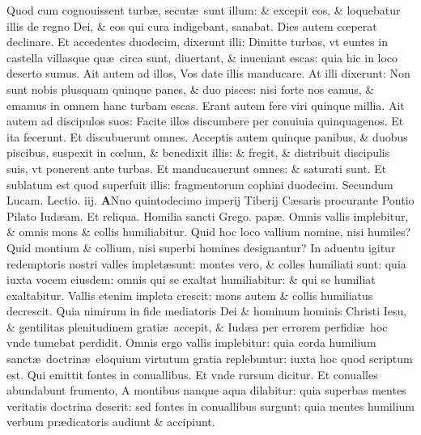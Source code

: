 \documentclass[a5paper,10pt]{book}
\def\rightmarginnote{%
	\lrmarginnote{\hskip\columnwidth \hskip -1em}}
\def\ae{æ}
\def\oe{œ}
\begin{document}
\begin{multicols*}{2}
Quod cum cognouissent turb\ae , secut\ae \ sunt illum: \& excepit eos, \& loquebatur illis de regno Dei, \& eos qui cura indigebant, sanabat.
Dies autem c\oe perat declinare. Et accedentes duodecim, dixerunt illi: Dimitte turbas, vt euntes in castella villasque qu\ae \ circa sunt, diuertant, \& inueniant escas: quia hic in loco deserto sumus.
Ait autem ad illos, Vos date illis manducare. At illi dixerunt: Non sunt nobis plusquam quinque panes, \& duo pisces: nisi forte nos eamus, \& emamus in omnem hanc turbam escas.
Erant autem fere viri quinque millia. Ait autem ad discipulos suos: Facite illos discumbere per conuiuia quinquagenos.
Et ita fecerunt. Et discubuerunt omnes.
Acceptis autem quinque panibus, \& duobus piscibus, suspexit in c\oe lum, \& benedixit illis: \& fregit, \& distribuit discipulis suis, vt ponerent ante turbas.
Et manducauerunt omnes: \& saturati sunt. Et sublatum est quod superfuit illis: fragmentorum cophini duodecim.
\newline \color{red} Secundum Lucam. Lectio. iij. \color{black}
\vspace{-.25em}
\lettrine[lines=2]{\bfseries \color{red} A}{}Nno\rightmarginnote{ca. 3.} quintodecimo imperij Tiberij C\ae saris procurante Pontio Pilato Iud\ae am.
\color{red} Et reliqua.
\newline Homilia sancti Grego. pap\ae . \color{black}
\newline \color{red} O\color{black}mnis vallis implebitur, \& omnis mons \& collis humiliabitur. Quid hoc loco vallium nomine, nisi humiles?
Quid montium \& collium, nisi superbi homines designantur?
In aduentu igitur redemptoris nostri valles implet\ae sunt: montes vero, \& colles humiliati sunt: quia iuxta vocem eiusdem: omnis qui se exaltat humiliabitur: \& qui se humiliat exaltabitur.
Vallis etenim impleta crescit: mons autem \& collis humiliatus decrescit.
Quia nimirum in fide mediatoris Dei \& hominum hominis Christi Iesu, \& gentilitas plenitudinem grati\ae \ accepit, \& Iud\ae a per errorem perfidi\ae \ hoc vnde tumebat perdidit.
Omnis ergo vallis implebitur: quia corda humilium sanct\ae \ doctrin\ae \ eloquium virtutum gratia replebuntur: iuxta hoc quod scriptum est.
Qui emittit fontes in conuallibus. Et vnde rursum dicitur. Et conualles abundabunt frumento, A montibus nanque aqua dilabitur: quia superbas mentes veritatis doctrina deserit: sed fontes in conuallibus surgunt: quia mentes humilium verbum pr\ae dicatoris audiunt \& accipiunt.

\end{multicols*}
\end{document}
